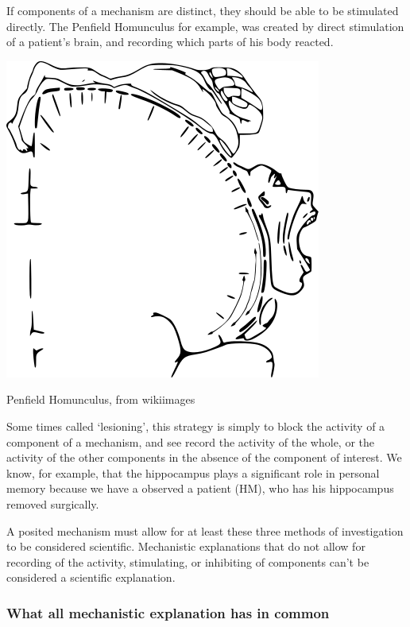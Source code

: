 \begin{refsection}
 If components of a mechanism are distinct, they should be able to be stimulated directly. The Penfield Homunculus for example, was created by direct stimulation of a patient’s brain, and recording which parts of his body reacted.\begin{marginfigure}
 \begin{center}

     \includegraphics{../Images/Motor_homunculus.png}

\end{center}
 \caption{Penfield Homunculus, from wikiimages}
\label{fig: MattachinePamphlet}
\end{marginfigure}


 Some times called ‘lesioning’, this strategy is simply to block the activity of a component of a mechanism, and see record the activity of the whole, or the activity of the other components in the absence of the component of interest. We know, for example, that the hippocampus plays a significant role in personal memory because we have a observed a patient (HM), who has his hippocampus removed surgically. ~\citep{Scoville:1957wx}

A posited mechanism must allow for at least these three methods of investigation to be considered scientific. Mechanistic explanations that do not allow for recording of the activity, stimulating, or inhibiting of components can’t be considered a scientific explanation. 

\subsubsection{What all mechanistic explanation has in common}
\label{whatallmechanisticexplanationhasincommon}


\end{refsection}
